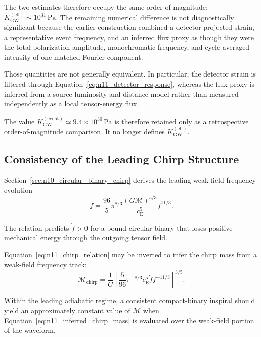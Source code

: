 The two estimates therefore occupy the same order of magnitude: $K_{\mathrm{GW}}^{(\mathrm{eff})} \sim 10^{31}\,\mathrm{Pa}$. The remaining numerical difference is not diagnostically significant because the earlier construction combined a detector-projected strain, a representative event frequency, and an inferred flux proxy as though they were the total polarization amplitude, monochromatic frequency, and cycle-averaged intensity of one matched Fourier component.

Those quantities are not generally equivalent. In particular, the detector strain is filtered through Equation~\eqref{eq:n11_detector_response}, whereas the flux proxy is inferred from a source luminosity and distance model rather than measured independently as a local tensor-energy flux.

The value $K_{\mathrm{GW}}^{(\mathrm{event})} \simeq 9.4\times10^{30}\,\mathrm{Pa}$ is therefore retained only as a retrospective order-of-magnitude comparison. It no longer defines $K_{\mathrm{GW}}^{(\mathrm{eff})}$.

\subsection{Consistency of the Leading Chirp Structure}
\label{subsec:n11_chirp_consistency}

Section~\ref{sec:n10_circular_binary_chirp} derives the leading weak-field frequency evolution
\begin{equation}
    \dot{f} = \frac{96}{5} \pi^{8/3} \frac{ \left( G\mathcal{M} \right)^{5/3} }{ c_{\mathrm{E}}^{5} } f^{11/3}.
    \label{eq:n11_chirp_relation}
\end{equation}

The relation predicts $\dot{f} > 0$ for a bound circular binary that loses positive mechanical energy through the outgoing tensor field.

Equation~\eqref{eq:n11_chirp_relation} may be inverted to infer the chirp mass from a weak-field frequency track:
\begin{equation}
    \mathcal{M}_{\mathrm{chirp}} = \frac{1}{G} \left[ \frac{5}{96} \pi^{-8/3} c_{\mathrm{E}}^{5} \dot{f} f^{-11/3} \right]^{3/5}.
    \label{eq:n11_inferred_chirp_mass}
\end{equation}

Within the leading adiabatic regime, a consistent compact-binary inspiral should yield an approximately constant value of $\mathcal{M}$ when Equation~\eqref{eq:n11_inferred_chirp_mass} is evaluated over the weak-field portion of the waveform.

